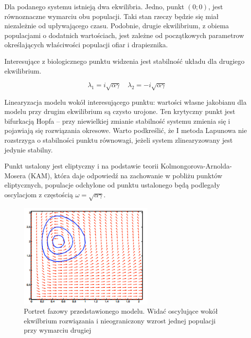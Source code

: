 \noindent Dla podanego systemu istnieją dwa ekwilibria. Jedno, punkt $(0;0)$, jest równoznaczne wymarciu obu populacji. Taki stan rzeczy będzie się miał  niezależnie od upływającego czasu. Podobnie, drugie ekwilibrium, z obiema populacjami o dodatnich wartościach, jest zależne od początkowych parametrow określających właściwości populacji ofiar i drapieznika.

\noindent Interesujące z biologicznego punktu widzenia jest stabilność układu dla drugiego ekwilibrium. 

\begin{equation}
\lambda_1=i\sqrt{\alpha\gamma} \quad \lambda_2=-i\sqrt{\alpha\gamma}
\end{equation}

\noindent Linearyzacja modelu wokół interesującego punktu: wartości własne jakobianu dla modelu przy drugim ekwilibrium są czysto urojone. Ten krytyczny punkt jest bifurkacją Hopfa – przy niewielkiej zmianie stabilność systemu zmienia się i pojawiają się rozwiązania okresowe. Warto podkreślić, że I metoda Lapunowa nie rozstrzyga o stabilności punktu równowagi, jeżeli system zlinearyzowany jest jedynie stabilny. \cite{Mit}

\noindent Punkt ustalony jest eliptyczny i na podstawie teorii Kolmongorova-Arnolda-Mosera (KAM), która daje odpowiedź na zachowanie w pobliżu punktów eliptycznych, populacje odchylone od punktu ustalonego będą podlegały oscylacjom z częstością $ \omega=\sqrt{\alpha\gamma} $.

\vspace{1cm}
\begin{figure}[ht]
	\centering
	\includegraphics[width=0.6\textwidth]{img/phase}
	\caption{Portret fazowy przedstawionego modelu. Widać oscylujące wokół ekwilbrium rozwiązania i nieograniczony wzrost jednej populacji przy wymarciu drugiej}
\end{figure}













